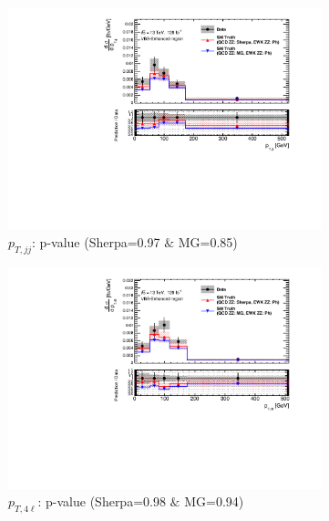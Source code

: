 \begin{figure}[!htbp]
\begin{subfigure}{.49\textwidth}
        \centering
        \includegraphics[width=.98\linewidth]{figures/Results/CrossSection_VBSEnhanced/xs_ptjj_SR.pdf}
        \caption{ \footnotesize{$p_{T,jj}$: p-value (Sherpa=0.97 $\&$ MG=0.85)}}
    \end{subfigure}
    \begin{subfigure}{.49\textwidth}
        \centering
        \includegraphics[width=.98\linewidth]{figures/Results/CrossSection_VBSEnhanced/xs_pt4l_SR.pdf}
        \caption{ \footnotesize{$p_{T,4\ell}$: p-value (Sherpa=0.98 $\&$ MG=0.94)}}
    \end{subfigure}\\
    \begin{subfigure}{.49\textwidth}
        \centering

\end{subfigure}
\end{figure}
